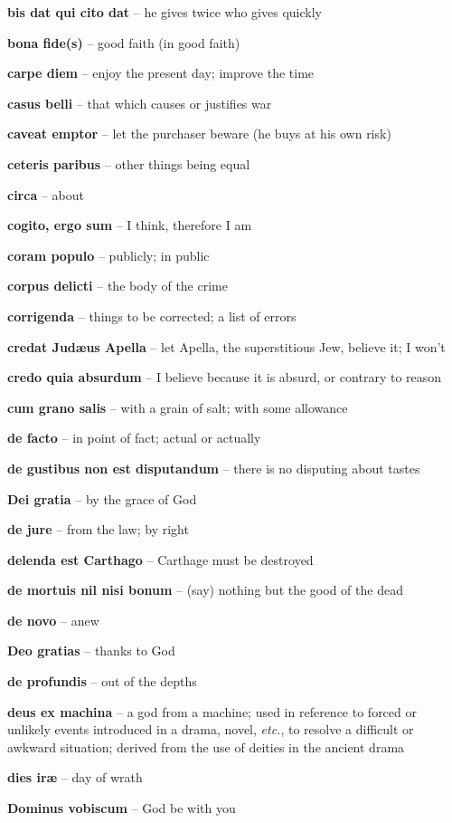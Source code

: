 \documentclass[12pt]{article}
\newcommand{\lat}[1]{\textbf{#1}}
\begin{document}
\lat{bis dat qui cito dat} -- he gives twice who gives quickly

\lat{bona fide(s)} -- good faith (in good faith)

\lat{carpe diem} -- enjoy the present day; improve the time

\lat{casus belli} -- that which causes or justifies war

\lat{caveat emptor} -- let the purchaser beware (he buys at his own risk)

\lat{ceteris paribus} -- other things being equal

\lat{circa} -- about

\lat{cogito, ergo sum} -- I think, therefore I am

\lat{coram populo} -- publicly; in public

\lat{corpus delicti} -- the body of the crime

\lat{corrigenda} -- things to be corrected; a list of errors

\lat{credat Jud\ae{us} Apella} -- let Apella, the superstitious Jew, believe it; I won't

\lat{credo quia absurdum} -- I believe because it is absurd, or contrary to reason

\lat{cum grano salis} -- with a grain of salt; with some allowance

\lat{de facto} -- in point of fact; actual or actually

\lat{de gustibus non est disputandum} -- there is no disputing about tastes

\lat{Dei gratia} -- by the grace of God

\lat{de jure} -- from the law; by right

\lat{delenda est Carthago} -- Carthage must be destroyed

\lat{de mortuis nil nisi bonum} -- (say) nothing but the good of the dead

\lat{de novo} -- anew

\lat{Deo gratias} -- thanks to God

\lat{de profundis} -- out of the depths

\lat{deus ex machina} -- a god from a machine; used in reference to forced or unlikely events introduced in a drama, novel, \emph{etc.}, to resolve a difficult or awkward situation; derived from the use of deities in the ancient drama

\lat{dies ir\ae} -- day of wrath

\lat{Dominus vobiscum} -- God be with you
\end{document}
